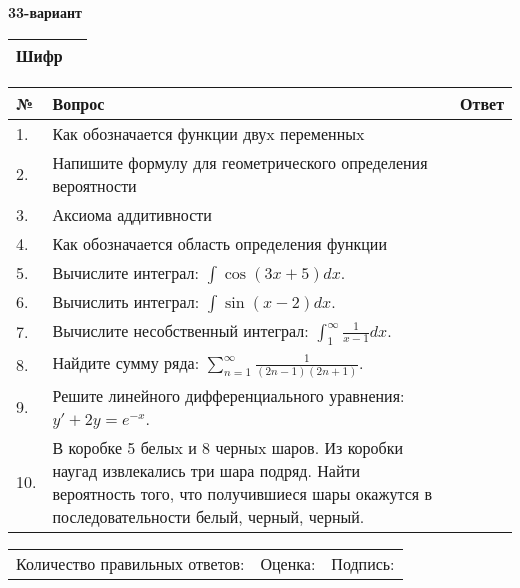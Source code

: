 \documentclass{article}
\begin{document}
  \egroup
  
  \newpage
  
  
  \textbf{33-вариант}\\
  
  \bgroup
  \def\arraystretch{1.6} %
  
  \begin{tabular}{|m{5.7cm}|m{9.5cm}|}
  \hline
  Шифр & \\
  \hline
  \end{tabular}
  
  \vspace{1cm}
  
  \begin{tabular}{|m{0.7cm}|m{10cm}|m{4cm}|}
  \hline
  № & Вопрос & Ответ \\
  \hline
  1. & Как обозначается функции двуx переменныx &  \\
  \hline
  2. & Напишите формулу для геометрического определения вероятности &  \\
  \hline
  3. & Аксиома аддитивности &  \\
  \hline
  4. & Как обозначается область определения функции &  \\
  \hline
  5. & Вычислите интеграл: \(\int{\cos(3x + 5)dx}\). &  \\
  \hline
  6. & Вычислить интеграл: \(\int{\sin(x - 2)dx}\). &  \\
  \hline
  7. & Вычислите несобственный интеграл: \(\int_{1}^{\infty}{\frac{1}{x - 1}dx}\). &  \\
  \hline
  8. & Найдите сумму ряда: \(\sum_{n = 1}^{\infty}\frac{1}{(2n - 1)(2n + 1)}\). &  \\
  \hline
  9. & Решите линейного дифференциального уравнения: \(y' + 2y = e^{- x}\). &  \\
  \hline
  10. & В коробке 5 белыx и 8 черныx шаров. Из коробки наугад извлекались три шара подряд. Найти вероятность того, что получившиеся шары окажутся в последовательности белый, черный, черный. &  \\
  \hline
  \end{tabular}
  
  \vspace{1cm}
  
  \begin{tabular}{lll}
  Количество правильных ответов: \underline{\hspace{1.5cm}} & 
  Оценка: \underline{\hspace{1.5cm}} & 
  Подпись: \underline{\hspace{2cm}} \\
  \end{tabular}
  
\end{document}
